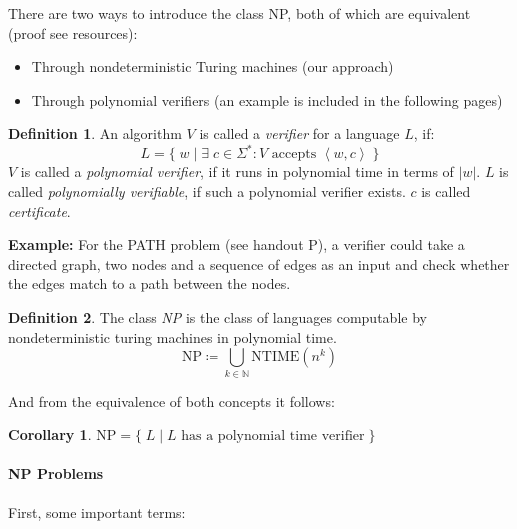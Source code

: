 \documentclass[10pt,fleqn]{article}
\theoremstyle{definition}
\newtheorem{definition}{Definition}
\newtheorem{corollary}{Corollary}
\theoremstyle{remark}
\newcommand{\npclass}{\text{NP}}
\newcommand{\lpp}{\left \langle}
\newcommand{\rpp}{\right \rangle}
\newcommand{\enc}[1]{\lpp #1 \rpp}
\begin{document}
There are two ways to introduce the class NP, both of which are equivalent (proof see resources):
\begin{itemize}
    \item Through nondeterministic Turing machines (our approach)
    \item Through polynomial verifiers (an example is included in the following pages)
\end{itemize}
\begin{definition} An algorithm \(V\) is called a \emph{verifier} for a language \(L\), if:
    \[
        L = \{\; w \mid \exists \; c \in \Sigma^*\colon V \text{ accepts } \enc{w, c} \; \}
    \]
    \(V\) is called a \emph{polynomial verifier}, if it runs in polynomial time in terms of \(|w|\). \(L\) is called \emph{polynomially verifiable}, if such a polynomial verifier exists. \(c\) is called \emph{certificate}.
\end{definition}
\textbf{Example:} For the PATH problem (see handout P), a verifier could take a directed graph, two nodes and a sequence of edges as an input and check whether the edges match to a path between the nodes.
\begin{minipage}{\linewidth}
    \centering
\end{minipage}
\begin{definition} The class \emph{NP} is the class of languages computable by nondeterministic turing machines in polynomial time.
    \[
        \npclass \coloneqq \bigcup_{k \in \mathbb{N}} \text{NTIME}(n^k)
    \]
\end{definition}
And from the equivalence of both concepts it follows:
\begin{corollary}
\(
    \npclass = \{\; L \mid L \text{ has a polynomial time verifier}\;\}
\)
\end{corollary}

\newpage

\paragraph*{NP Problems} First, some important terms:\\
\end{document}
